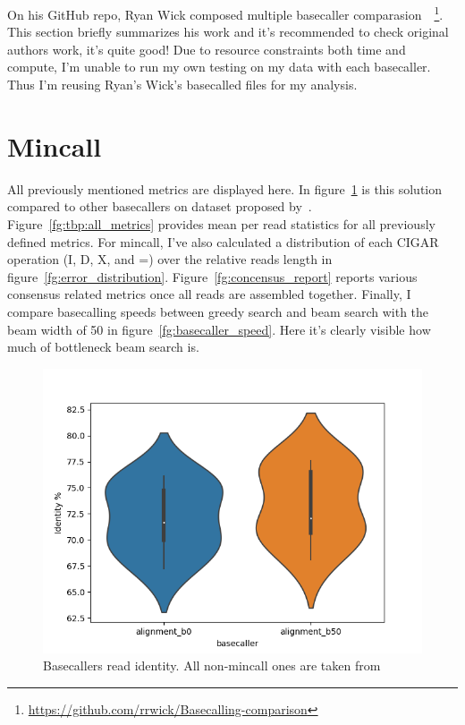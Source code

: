 \documentclass[times, utf8, diplomski, english]{fer}
\begin{document}
On his GitHub repo, Ryan Wick composed multiple basecaller comparasion~\citep{rwick_basecalling_cmp}~\footnote{\url{https://github.com/rrwick/Basecalling-comparison}}. 
This section briefly summarizes his work and it's recommended to check original authors work, it's quite good! 
Due to resource constraints both time and compute, I'm unable to run my own testing on my data with each basecaller. Thus I'm reusing Ryan's Wick's basecalled files for my analysis. 

\section{Mincall}
All previously mentioned metrics are displayed here. In figure~\ref{fg:identity_rate} is this solution compared to other basecallers on dataset proposed by~\citep{rwick_basecalling_cmp}.
Figure~\ref{fg:tbp:all_metrics} provides mean per read statistics for all previously defined metrics. 
For mincall, I've also calculated a distribution of each CIGAR operation (I, D, X, and =) over the relative reads length in figure~\ref{fg:error_distribution}.
Figure~\ref{fg:concensus_report} reports various consensus related metrics once all reads are assembled together.
Finally, I compare basecalling speeds between greedy search and beam search with the beam width of 50 in figure~\ref{fg:basecaller_speed}. 
Here it's clearly visible how much of bottleneck beam search is.

\begin{figure}
    \label{fg:identity_rate}
    \begin{center}
        \includegraphics[width=\textwidth]{read_violin_Identity}
        \caption{Basecallers read identity. All non-mincall ones are taken from~\cite{rwick_basecalling_cmp}}
    \end{center}
\end{figure}
\end{document}
